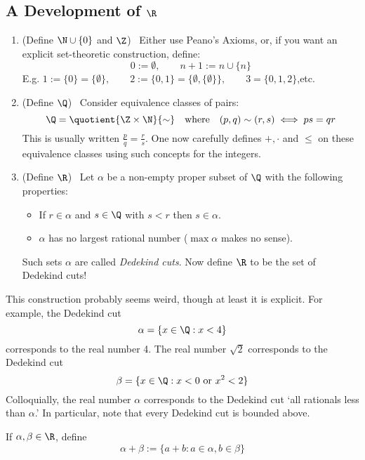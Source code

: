 \subsection{A Development of $\R$}

\begin{enumerate}
	\item (Define $\N\cup\{0\}$ and $\Z$) \ Either use Peano's Axioms, or, if you want an explicit set-theoretic construction, define:
	\[0:=\emptyset,\qquad n+1:=n\cup \{n\}\]
	E.g. $1:=\{0\}=\{\emptyset\},\qquad 2:=\{0,1\}=\{\emptyset,\{\emptyset\}\},\qquad 3=\{0,1,2\}$,\qquad etc.
	\item (Define $\Q$) \ Consider equivalence classes of pairs:
	\[\Q=\quotient{\Z\times\N}{\sim}\quad\text{where}\quad(p,q)\sim(r,s)\iff ps=qr\]
	This is usually written $\frac pq=\frac rs$. One now carefully defines $+,\cdot$ and $\le$ on these equivalence classes using such concepts for the integers.
	\item (Define $\R$) \ Let $\alpha$ be a non-empty proper subset of $\Q$ with the following properties:
	\begin{itemize}
  	\item If $r\in\alpha$ and $s\in\Q$ with $s<r$ then $s\in\alpha$.
  	\item $\alpha$ has no largest rational number ($\max\alpha$ makes no sense).
	\end{itemize}
	Such sets $\alpha$ are called \emph{Dedekind cuts}. Now define $\R$ to be the set of Dedekind cuts!
\end{enumerate}

This construction probably seems weird, though at least it is explicit. For example, the Dedekind cut
\[\alpha=\{x\in\Q:x<4\}\]
corresponds to the real number 4. The real number $\sqrt 2$ corresponds to the Dedekind cut
\[\beta=\{x\in\Q:x<0\text{ or }x^2<2\}\]
Colloquially, the real number $\alpha$ corresponds to the Dedekind cut `all rationals less than $\alpha$.' In particular, note that every Dedekind cut is bounded above.\\

\begin{defn}
If $\alpha,\beta\in\R$, define
\[\alpha+\beta:=\{a+b:a\in\alpha,b\in\beta\}\]
\end{defn}


